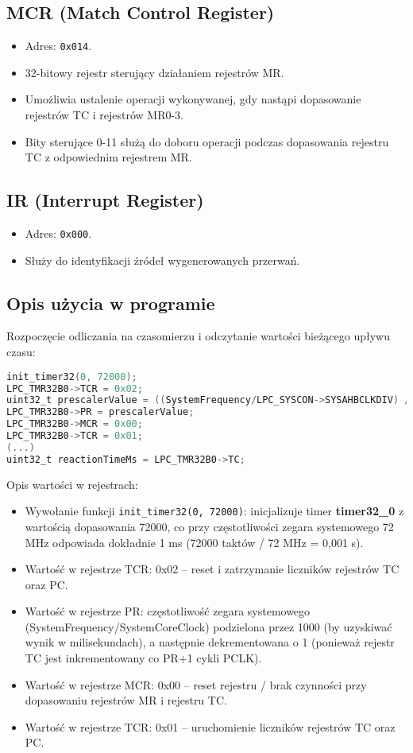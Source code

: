 \documentclass[a4paper,12pt]{report}
\begin{document}
\subsection{MCR (Match Control Register)}
\begin{itemize}
    \item Adres: \texttt{0x014}.
    \item 32-bitowy rejestr sterujący działaniem rejestrów MR.
    \item Umożliwia ustalenie operacji wykonywanej, gdy nastąpi dopasowanie rejestrów TC i rejestrów MR0-3.
    \item Bity sterujące 0-11 służą do doboru operacji podczas dopasowania rejestru TC z odpowiednim rejestrem MR.
\end{itemize}

\subsection{IR (Interrupt Register)}
\begin{itemize}
    \item Adres: \texttt{0x000}.
    \item Służy do identyfikacji źródeł wygenerowanych przerwań.
\end{itemize}

\subsection{Opis użycia w programie}
Rozpoczęcie odliczania na czasomierzu i odczytanie wartości bieżącego upływu czasu:
\begin{lstlisting}[language=C]
init_timer32(0, 72000);
LPC_TMR32B0->TCR = 0x02;
uint32_t prescalerValue = ((SystemFrequency/LPC_SYSCON->SYSAHBCLKDIV) / 1000) - 1;
LPC_TMR32B0->PR = prescalerValue;
LPC_TMR32B0->MCR = 0x00;
LPC_TMR32B0->TCR = 0x01;
(...)
uint32_t reactionTimeMs = LPC_TMR32B0->TC;
\end{lstlisting}

Opis wartości w rejestrach:
\begin{itemize}
    \item Wywołanie funkcji \texttt{init\_timer32(0, 72000)}: inicjalizuje timer \textbf{timer32\_0} z wartością dopasowania 72000, co przy częstotliwości zegara systemowego 72 MHz odpowiada dokładnie 1 ms (72000 taktów / 72 MHz = 0{,}001 s).
    \item Wartość w rejestrze TCR: 0x02 – reset i zatrzymanie liczników rejestrów TC oraz PC.
    \item Wartość w rejestrze PR: częstotliwość zegara systemowego (SystemFrequency/SystemCoreClock) podzielona przez 1000 (by uzyskiwać wynik w milisekundach), a następnie dekrementowana o 1 (ponieważ rejestr TC jest inkrementowany co PR+1 cykli PCLK).
    \item Wartość w rejestrze MCR: 0x00 – reset rejestru / brak czynności przy dopasowaniu rejestrów MR i rejestru TC.
    \item Wartość w rejestrze TCR: 0x01 – uruchomienie liczników rejestrów TC oraz PC.
\end{itemize}
\vspace{15pt}
\end{document}
